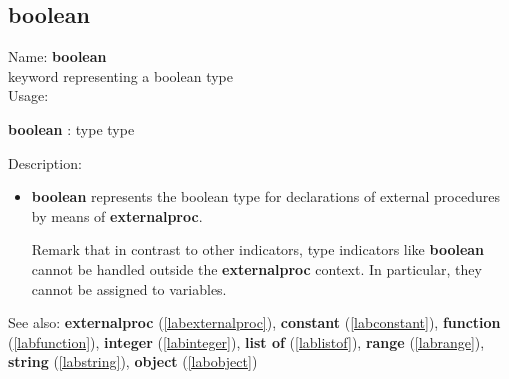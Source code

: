 \subsection{boolean}
\label{labboolean}
\noindent Name: \textbf{boolean}\\
\phantom{aaa}keyword representing a \textsf{boolean} type \\[0.2cm]
\noindent Usage: 
\begin{center}
\textbf{boolean} : \textsf{type type}\\
\end{center}
\noindent Description: \begin{itemize}

\item \textbf{boolean} represents the \textsf{boolean} type for declarations
   of external procedures by means of \textbf{externalproc}.
    
   Remark that in contrast to other indicators, type indicators like
   \textbf{boolean} cannot be handled outside the \textbf{externalproc} context.  In
   particular, they cannot be assigned to variables.
\end{itemize}
See also: \textbf{externalproc} (\ref{labexternalproc}), \textbf{constant} (\ref{labconstant}), \textbf{function} (\ref{labfunction}), \textbf{integer} (\ref{labinteger}), \textbf{list of} (\ref{lablistof}), \textbf{range} (\ref{labrange}), \textbf{string} (\ref{labstring}), \textbf{object} (\ref{labobject})
